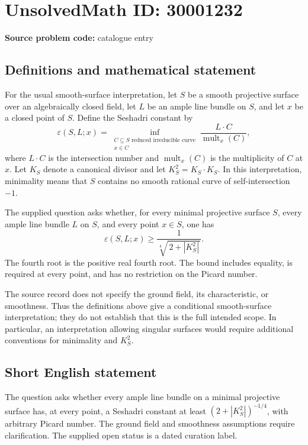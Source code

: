 \documentclass[11pt]{article}
\begin{document}
\section*{UnsolvedMath ID: 30001232}
\textbf{Source problem code:} catalogue entry
\subsection{Definitions and mathematical statement}
For the usual smooth-surface interpretation, let \(S\) be a smooth projective surface over an algebraically closed field, let \(L\) be an ample line bundle on \(S\), and let \(x\) be a closed point of \(S\). Define the Seshadri constant by
\[
\varepsilon(S,L;x)=\inf_{\substack{C\subseteq S\text{ reduced irreducible curve}\\x\in C}}\frac{L\cdot C}{\operatorname{mult}_x(C)},
\]
where \(L\cdot C\) is the intersection number and \(\operatorname{mult}_x(C)\) is the multiplicity of \(C\) at \(x\). Let \(K_S\) denote a canonical divisor and let \(K_S^2=K_S\cdot K_S\). In this interpretation, minimality means that \(S\) contains no smooth rational curve of self-intersection \(-1\).

The supplied question asks whether, for every minimal projective surface \(S\), every ample line bundle \(L\) on \(S\), and every point \(x\in S\), one has
\[
\varepsilon(S,L;x)\geq\frac{1}{\sqrt[4]{\,2+|K_S^2|\,}}.
\]
The fourth root is the positive real fourth root. The bound includes equality, is required at every point, and has no restriction on the Picard number.

The source record does not specify the ground field, its characteristic, or smoothness. Thus the definitions above give a conditional smooth-surface interpretation; they do not establish that this is the full intended scope. In particular, an interpretation allowing singular surfaces would require additional conventions for minimality and \(K_S^2\).
\subsection{Short English statement}
The question asks whether every ample line bundle on a minimal projective surface has, at every point, a Seshadri constant at least \((2+|K_S^2|)^{-1/4}\), with arbitrary Picard number. The ground field and smoothness assumptions require clarification. The supplied open status is a dated curation label.
\end{document}
